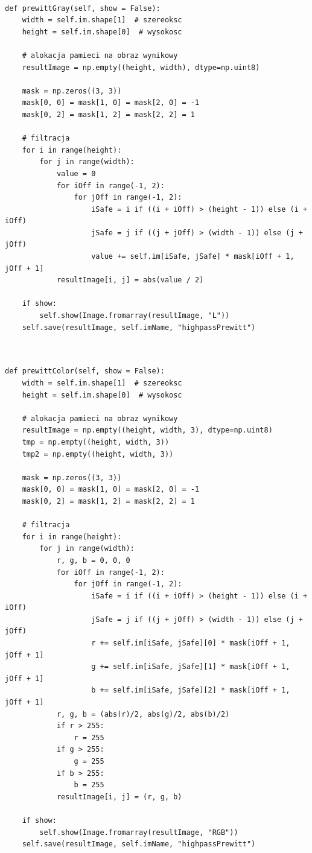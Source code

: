 \documentclass[final,a4paper,openany,12pt]{mwbk}
\begin{document}

\begin{lstlisting}[caption=Operator Prewitt'a (obraz szary)]
	
def prewittGray(self, show = False):
	width = self.im.shape[1]  # szereoksc
	height = self.im.shape[0]  # wysokosc
	
	# alokacja pamieci na obraz wynikowy
	resultImage = np.empty((height, width), dtype=np.uint8)
	
	mask = np.zeros((3, 3))
	mask[0, 0] = mask[1, 0] = mask[2, 0] = -1
	mask[0, 2] = mask[1, 2] = mask[2, 2] = 1
	
	# filtracja
	for i in range(height):
		for j in range(width):
			value = 0
			for iOff in range(-1, 2):
				for jOff in range(-1, 2):
					iSafe = i if ((i + iOff) > (height - 1)) else (i + iOff)
					jSafe = j if ((j + jOff) > (width - 1)) else (j + jOff)
					value += self.im[iSafe, jSafe] * mask[iOff + 1, jOff + 1]
			resultImage[i, j] = abs(value / 2)
	
	if show:
		self.show(Image.fromarray(resultImage, "L"))
	self.save(resultImage, self.imName, "highpassPrewitt")
	
\end{lstlisting}

\newpage


\begin{lstlisting}[caption=Operator Prewitt'a (obraz barwny)]
	
def prewittColor(self, show = False):
	width = self.im.shape[1]  # szereoksc
	height = self.im.shape[0]  # wysokosc
	
	# alokacja pamieci na obraz wynikowy
	resultImage = np.empty((height, width, 3), dtype=np.uint8)
	tmp = np.empty((height, width, 3))
	tmp2 = np.empty((height, width, 3))
	
	mask = np.zeros((3, 3))
	mask[0, 0] = mask[1, 0] = mask[2, 0] = -1
	mask[0, 2] = mask[1, 2] = mask[2, 2] = 1
	
	# filtracja
	for i in range(height):
		for j in range(width):
			r, g, b = 0, 0, 0
			for iOff in range(-1, 2):
				for jOff in range(-1, 2):
					iSafe = i if ((i + iOff) > (height - 1)) else (i + iOff)
					jSafe = j if ((j + jOff) > (width - 1)) else (j + jOff)
					r += self.im[iSafe, jSafe][0] * mask[iOff + 1, jOff + 1]
					g += self.im[iSafe, jSafe][1] * mask[iOff + 1, jOff + 1]
					b += self.im[iSafe, jSafe][2] * mask[iOff + 1, jOff + 1]
			r, g, b = (abs(r)/2, abs(g)/2, abs(b)/2)
			if r > 255:
				r = 255
			if g > 255:
				g = 255
			if b > 255:
				b = 255
			resultImage[i, j] = (r, g, b)
	
	if show:
		self.show(Image.fromarray(resultImage, "RGB"))
	self.save(resultImage, self.imName, "highpassPrewitt")
	
\end{lstlisting}
\end{document}
